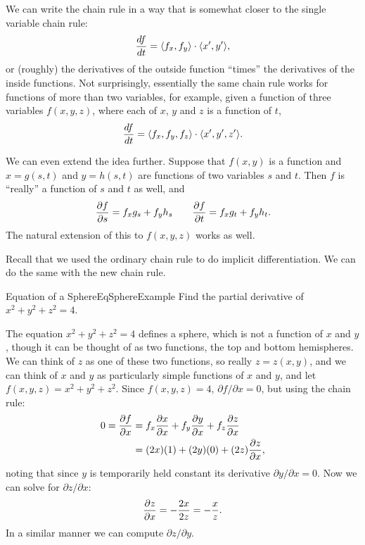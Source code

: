 We can write the chain rule in a way that is somewhat closer to the
single variable chain rule:
$${df\over dt}=\langle f_x,f_y\rangle\cdot\langle x',y'\rangle,$$
or (roughly) the derivatives of the outside function ``times'' the
derivatives of the inside functions.
Not surprisingly, essentially the same chain rule works for functions
of more than two variables, for example, given a function of three
variables $f(x,y,z)$, where each of $x$, $y$ and $z$ is a function of
$t$, 
$${df\over dt}=\langle f_x,f_y,f_z\rangle\cdot\langle x',y',z'\rangle.$$

We can even extend the idea further. Suppose that $f(x,y)$ is a
function and $x=g(s,t)$ and $y=h(s,t)$ are functions of two variables
$s$ and $t$. Then $f$ is ``really'' a function of $s$ and $t$ as well, and 
$${\partial f\over\partial s}=f_xg_s+f_yh_s\qquad
{\partial f\over\partial t}=f_xg_t+f_yh_t.$$
The natural extension of this to $f(x,y,z)$ works as well.

Recall that we used the ordinary chain rule to do implicit
differentiation. We can do the same
with the new chain rule.

\begin{example}{Equation of a Sphere}{EqSphereExample}
Find the partial derivative of $x^2+y^2+z^2 = 4$.
\end{example}
\begin{solution}
The equation $x^2+y^2+z^2 = 4$ defines a sphere, which is not a function of
$x$ and $y$, though it can be thought of as two functions, the top and
bottom hemispheres. We can think of $z$ as one of these two functions,
so really $z=z(x,y)$, and we can think of $x$ and $y$ as particularly
simple functions of $x$ and $y$, and let $f(x,y,z)=x^2+y^2+z^2$.
Since $f(x,y,z)=4$, $\partial f/\partial x=0$, but
using the chain rule:
\begin{align*}
0={\partial f\over\partial x}&=f_x{\partial x\over\partial x}+
f_y{\partial y\over\partial x}+f_z{\partial z\over \partial x}	\\
&=(2x)(1)+(2y)(0)+(2z){\partial z\over\partial x},	\\
\end{align*}
noting that since $y$ is temporarily held constant its derivative
${\partial y/\partial x}=0$. Now we can solve for $\partial z/\partial
x$:
$${\partial z\over \partial x}=-{2x\over 2z}=-{x\over z}.
$$
In a similar manner we can compute $\partial z/\partial y$.
\end{solution}


